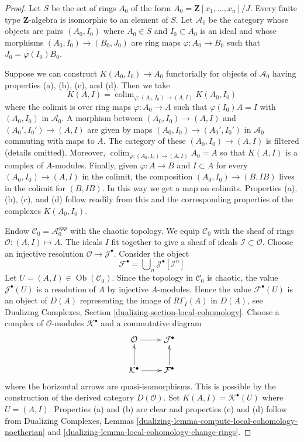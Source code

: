 \documentclass{stacks-project}
\theoremstyle{plain}
\theoremstyle{definition}
\theoremstyle{remark}
\numberwithin{equation}{subsection}
\def\colim{\mathop{\mathrm{colim}}\nolimits}
\def\Ob{\mathop{\mathrm{Ob}}\nolimits}
\begin{document}
\begin{proof}
Let $S$ be the set of rings $A_0$ of the form
$A_0 = \mathbf{Z}[x_1, \ldots, x_n]/J$.
Every finite type $\mathbf{Z}$-algebra is isomorphic to
an element of $S$. Let $\mathcal{A}_0$ be the category whose objects
are pairs $(A_0, I_0)$ where $A_0 \in S$ and $I_0 \subset A_0$
is an ideal and whose morphisms $(A_0, I_0) \to (B_0, J_0)$ are
ring maps $\varphi : A_0 \to B_0$ such that $J_0 = \varphi(I_0)B_0$.

\medskip\noindent
Suppose we can construct $K(A_0, I_0) \to A_0$ functorially for
objects of $\mathcal{A}_0$ having properties (a), (b), (c), and (d).
Then we take
$$
K(A, I) = \colim_{\varphi : (A_0, I_0) \to (A, I)} K(A_0, I_0)
$$
where the colimit is over ring maps $\varphi : A_0 \to A$ such
that $\varphi(I_0)A = I$ with $(A_0, I_0)$ in $\mathcal{A}_0$.
A morphism between $(A_0, I_0) \to (A, I)$ and $(A_0', I_0') \to (A, I)$
are given by maps $(A_0, I_0) \to (A_0', I_0')$ in $\mathcal{A}_0$
commuting with maps to $A$.
The category of these $(A_0, I_0) \to (A, I)$ is filtered
(details omitted). Moreover, $\colim_{\varphi : (A_0, I_0) \to (A, I)} A_0 = A$
so that $K(A, I)$ is a complex of $A$-modules.
Finally, given $\varphi : A \to B$ and $I \subset A$
for every $(A_0, I_0) \to (A, I)$ in the colimit, the composition
$(A_0, I_0) \to (B, IB)$ lives in the colimit for $(B, IB)$.
In this way we get a map on colimits. Properties (a), (b), (c), and (d)
follow readily from this and the corresponding
properties of the complexes $K(A_0, I_0)$.

\medskip\noindent
Endow $\mathcal{C}_0 = \mathcal{A}_0^{opp}$ with the chaotic topology.
We equip $\mathcal{C}_0$ with the sheaf of rings
$\mathcal{O} : (A, I) \mapsto A$. The ideals $I$ fit together to give a
sheaf of ideals $\mathcal{I} \subset \mathcal{O}$.
Choose an injective resolution $\mathcal{O} \to \mathcal{J}^\bullet$.
Consider the object
$$
\mathcal{F}^\bullet = \bigcup\nolimits_n \mathcal{J}^\bullet[\mathcal{I}^n]
$$
Let $U = (A, I) \in \Ob(\mathcal{C}_0)$.
Since the topology in $\mathcal{C}_0$ is chaotic, the value
$\mathcal{J}^\bullet(U)$ is a resolution of $A$ by injective
$A$-modules. Hence the value $\mathcal{F}^\bullet(U)$ is an
object of $D(A)$ representing the image of $R\Gamma_I(A)$ in $D(A)$, see
Dualizing Complexes, Section \ref{dualizing-section-local-cohomology}.
Choose a complex of $\mathcal{O}$-modules $\mathcal{K}^\bullet$
and a commutative diagram
$$
\xymatrix{
\mathcal{O} \ar[r] & \mathcal{J}^\bullet \\
\mathcal{K}^\bullet \ar[r] \ar[u] & \mathcal{F}^\bullet \ar[u]
}
$$
where the horizontal arrows are quasi-isomorphisms. This is possible
by the construction of the derived category $D(\mathcal{O})$.
Set $K(A, I) = \mathcal{K}^\bullet(U)$ where $U = (A, I)$.
Properties (a) and (b) are clear and properties (c) and (d)
follow from Dualizing Complexes, Lemmas
\ref{dualizing-lemma-compute-local-cohomology-noetherian} and
\ref{dualizing-lemma-local-cohomology-change-rings}.
\end{proof}
\end{document}
